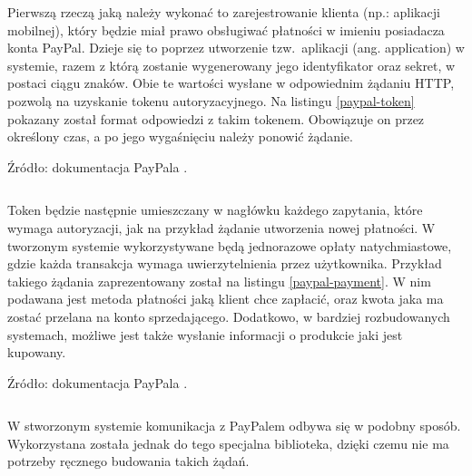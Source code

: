 Pierwszą rzeczą jaką należy wykonać to zarejestrowanie klienta (np.: aplikacji mobilnej), który będzie 
miał prawo obsługiwać płatności w imieniu posiadacza konta PayPal. Dzieje się 
to poprzez utworzenie tzw.~aplikacji (ang. application) w systemie, razem z którą zostanie wygenerowany jego 
identyfikator oraz sekret, w postaci ciągu znaków. Obie te wartości wysłane w 
odpowiednim żądaniu HTTP, pozwolą na uzyskanie tokenu autoryzacyjnego. Na 
listingu \ref{paypal-token} pokazany został format odpowiedzi z takim tokenem. 
Obowiązuje on przez określony czas, a po jego wygaśnięciu należy ponowić 
żądanie.

\begin{singlespace}
	\vspace{-0.4cm}
	\caption*{Źródło: dokumentacja PayPala \cite{elektroniczne_metody_platnosci}.}
	\label{paypal-token}
	\vspace{0.3cm}
	\inputminted[fontsize=\footnotesize]{json}{src/api/paypal-auth.json}
\end{singlespace}

Token będzie następnie umieszczany w nagłówku każdego zapytania, które 
wymaga autoryzacji, jak na przykład żądanie utworzenia nowej płatności. 
W tworzonym systemie wykorzystywane będą jednorazowe opłaty natychmiastowe, 
gdzie każda transakcja wymaga uwierzytelnienia przez użytkownika. Przykład 
takiego żądania zaprezentowany został na listingu \ref{paypal-payment}. W nim 
podawana jest metoda płatności jaką klient chce zapłacić, oraz kwota jaka ma zostać przelana na konto 
sprzedającego. Dodatkowo, w bardziej rozbudowanych systemach, możliwe jest 
także wysłanie informacji o produkcie jaki jest kupowany.

\begin{singlespace}
	\vspace{-0.4cm}
	\caption*{Źródło: dokumentacja PayPala \cite{elektroniczne_metody_platnosci}.}
	\label{paypal-payment}
	\vspace{0.3cm}
	\inputminted[fontsize=\footnotesize]{json}{src/api/paypal-payment-request.json}
\end{singlespace}

W stworzonym systemie komunikacja z PayPalem odbywa się w podobny sposób. 
Wykorzystana została jednak do tego specjalna biblioteka, dzięki czemu nie ma 
potrzeby ręcznego budowania takich żądań. 

